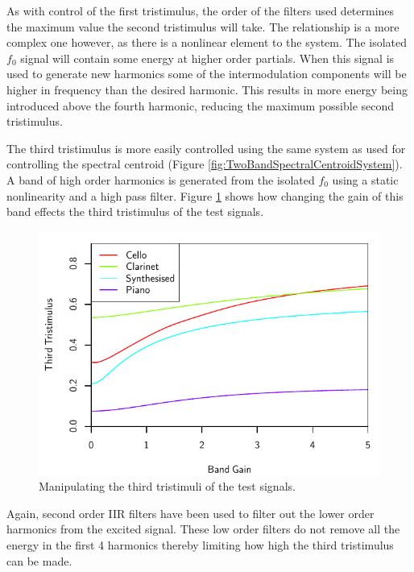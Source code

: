 		As with control of the first tristimulus, the order of the filters used determines the maximum value the
		second tristimulus will take. The relationship is a more complex one however, as there is a nonlinear
		element to the system. The isolated $f_{0}$ signal will contain some energy at higher order partials.  When
		this signal is used to generate new harmonics some of the intermodulation components will be higher in
		frequency than the desired harmonic. This results in more energy being introduced above the fourth
		harmonic, reducing the maximum possible second tristimulus.

		The third tristimulus is more easily controlled using the same system as used for controlling the spectral
		centroid (Figure \ref{fig:TwoBandSpectralCentroidSystem}). A band of high order harmonics is generated from
		the isolated $f_{0}$ using a static nonlinearity and a high pass filter.  Figure \ref{fig:MoveTristimulus3}
		shows how changing the gain of this band effects the third tristimulus of the test signals.

		\begin{figure}[h!]
			\centering
			\includegraphics{chapter6/Images/MoveTristimulus3.pdf}
			\caption{Manipulating the third tristimuli of the test signals.}
			\label{fig:MoveTristimulus3}
		\end{figure}

		Again, second order IIR filters have been used to filter out the lower order harmonics from the excited
		signal.	These low order filters do not remove all the energy in the first 4 harmonics thereby limiting how
		high the third tristimulus can be made.

